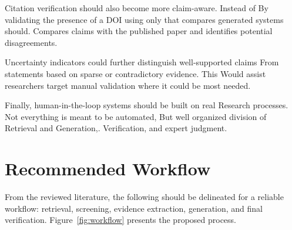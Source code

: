 \documentclass[acmsmall,screen]{acmart}
\begin{document}
Citation verification should also become more claim-aware. Instead of
By validating the presence of a DOI using only that compares generated systems should.
Compares claims with the published paper and identifies potential disagreements.

Uncertainty indicators could further distinguish well-supported claims
From statements based on sparse or contradictory evidence. This
Would assist researchers target manual validation where it could be most
needed.

Finally, human-in-the-loop systems should be built on real
Research processes. Not everything is meant to be automated,
But well organized division of Retrieval and Generation,.
Verification, and expert judgment.

\section{Recommended Workflow}

From the reviewed literature, the following should be delineated for a reliable workflow:
retrieval, screening, evidence extraction, generation, and final
verification. Figure~\ref{fig:workflow} presents the proposed process.
\end{document}
